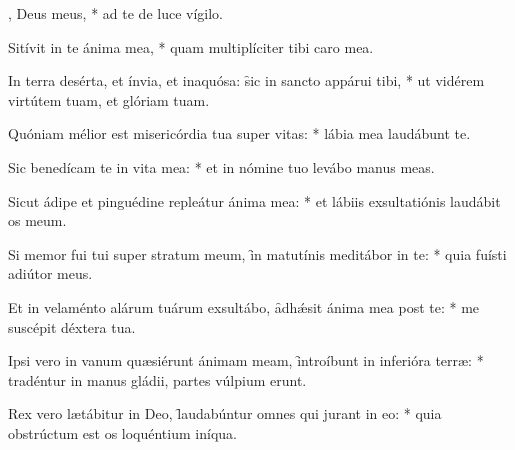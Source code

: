 \begin{psalmus}

, Deus meus, * ad te de luce vígilo.

Sitívit in te ánima mea, * quam multiplíciter tibi caro mea.

In terra desérta, et ínvia, et inaquósa: \f sic in sancto appárui tibi, * ut vidérem virtútem tuam, et glóriam tuam.

Quóniam mélior est misericórdia tua super vitas: * lábia mea laudábunt te.

Sic benedícam te in vita mea: * et in nómine tuo levábo manus meas.

Sicut ádipe et pinguédine repleátur ánima mea: * et lábiis exsultatiónis laudábit os meum.

Si memor fui tui super stratum meum, \f in matutínis meditábor in te: * quia fuísti adiútor meus.

Et in velaménto alárum tuárum exsultábo, \f adhǽsit ánima mea post te: * me suscépit déxtera tua.

Ipsi vero in vanum quæsiérunt ánimam meam, \f introíbunt in inferióra terræ: * tradéntur in manus gládii, partes vúlpium erunt.

Rex vero lætábitur in Deo, \f laudabúntur omnes qui jurant in eo: * quia obstrúctum est os loquéntium iníqua.

\end{psalmus}
